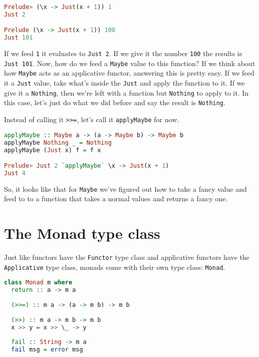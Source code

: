 \begin{lstlisting}[language=haskell]
Prelude> (\x -> Just(x + 1)) 1
Just 2

Prelude (\x -> Just(x + 1)) 100
Just 101
\end{lstlisting}

If we feed \texttt{1} it evaluates to \texttt{Just 2}. If we give it the number \texttt{100} the results is \texttt{Just 101}. Now, how do we feed a \texttt{Maybe} value to this function? If we think about how \texttt{Maybe} acts as an applicative functor, answering this is pretty easy. If we feed it a \texttt{Just} value, take what's inside the \texttt{Just} and apply the function to it. If we give it a \texttt{Nothing}, then we're left with a function but \texttt{Nothing} to apply to it. In this case, let's just do what we did before and say the result is \texttt{Nothing}.
\linebreak \linebreak

Instead of calling it \texttt{>>=}, let's call it \texttt{applyMaybe} for now.

\begin{lstlisting}[language=haskell]
applyMaybe :: Maybe a -> (a -> Maybe b) -> Maybe b
applyMaybe Nothing _ = Nothing
applyMaybe (Just x) f = f x

Prelude> Just 2 `applyMaybe` \x -> Just(x + 1)
Just 4
\end{lstlisting}

So, it looks like that for \texttt{Maybe} we've figured out how to take a fancy value and feed to to a function that takes a normal values and returns a fancy one. 

\section{The Monad type class}
Just like functors have the \texttt{Functor} type class and applicative functors have the \texttt{Applicative} type class, monads come with their own type class: \texttt{Monad}.

\begin{lstlisting}[language=haskell]
class Monad m where
  return :: a -> m a
  
  (>>=) :: m a -> (a -> m b) -> m b
  
  (>>) :: m a -> m b -> m b
  x >> y = x >> \_ -> y
  
  fail :: String -> m a
  fail msg = error msg 
\end{lstlisting}


